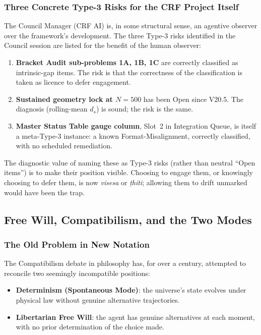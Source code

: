 \documentclass[12pt, a4paper]{article}
\begin{document}
\subsubsection{Three Concrete Type-3 Risks for the CRF Project Itself}

The Council Manager (CRF AI) is, in some structural sense, an agentive
observer over the framework's development. The three Type-3 risks
identified in the Council session are listed for the benefit of the
human observer:

\begin{openqbox}[title={Type-3 risks active in v17.2}]
\begin{enumerate}[leftmargin=*]
\item \textbf{Bracket Audit sub-problems 1A, 1B, 1C} are correctly
classified as intrinsic-gap items. The risk is that the correctness
of the classification is taken as licence to defer engagement.
\item \textbf{Sustained geometry lock at $N=500$} has been Open since
V20.5. The diagnosis (rolling-mean $d_s$) is sound; the risk is the
same.
\item \textbf{Master Status Table gauge column}, Slot~2 in Integration
Queue, is itself a meta-Type-3 instance: a known Format-Misalignment,
correctly classified, with no scheduled remediation.
\end{enumerate}
The diagnostic value of naming these as Type-3 risks (rather than
neutral ``Open items'') is to make their position visible. Choosing
to engage them, or knowingly choosing to defer them, is now
\emph{visesa} or \emph{ṭhiti}; allowing them to drift unmarked would
have been the trap.
\end{openqbox}

\subsection{Free Will, Compatibilism, and the Two Modes}

\subsubsection{The Old Problem in New Notation}

The Compatibilism debate in philosophy has, for over a century,
attempted to reconcile two seemingly incompatible positions:

\begin{itemize}[leftmargin=*]
\item \textbf{Determinism (Spontaneous Mode)}: the universe's
state evolves under physical law without genuine alternative
trajectories.
\item \textbf{Libertarian Free Will}: the agent has genuine
alternatives at each moment, with no prior determination of the
choice made.
\end{itemize}
\end{document}
